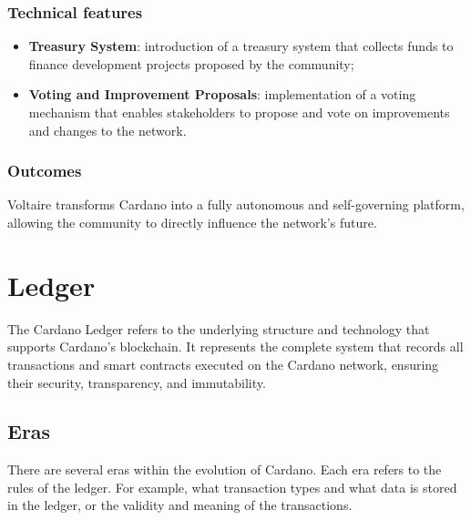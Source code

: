 \subsubsection*{Technical features}
\begin{itemize}
    \item \textbf{Treasury System}: introduction of a treasury system that collects funds 
        to finance development projects proposed by the community;
    \item \textbf{Voting and Improvement Proposals}: implementation of a voting mechanism 
        that enables stakeholders to propose and vote on improvements and changes to the 
        network.
\end{itemize}

\subsubsection*{Outcomes}
Voltaire transforms Cardano into a fully autonomous and self-governing platform, allowing 
the community to directly influence the network's future.

\vspace{0.5cm}

\section{Ledger}

The Cardano Ledger refers to the underlying structure and technology that supports 
Cardano's blockchain. It represents the complete system that records all transactions and 
smart contracts executed on the Cardano network, ensuring their security, transparency, 
and immutability.

\vspace{0.5cm}

\subsection{Eras}

There are several eras within the evolution of Cardano. Each era refers to the rules of 
the ledger. For example, what transaction types and what data is stored in the ledger, 
or the validity and meaning of the transactions.

\vspace{0.5cm}

